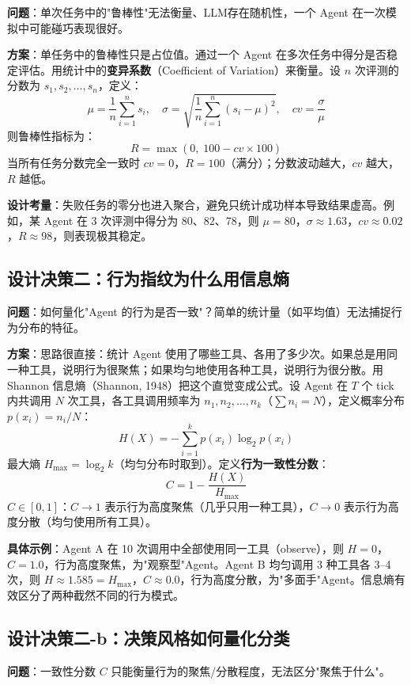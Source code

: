 \documentclass[12pt,a4paper]{article}%
\begin{document}
\textbf{问题}：单次任务中的"鲁棒性"无法衡量、LLM存在随机性，一个 Agent 在一次模拟中可能碰巧表现很好。

\textbf{方案}：单任务中的鲁棒性只是占位值。通过一个 Agent 在多次任务中得分是否稳定评估。用统计中的\textbf{变异系数}（Coefficient of Variation）来衡量。设 $n$ 次评测的分数为 $s_1, s_2, \ldots, s_n$，定义：
\[
\mu = \frac{1}{n}\sum_{i=1}^{n}s_i, \quad \sigma = \sqrt{\frac{1}{n}\sum_{i=1}^{n}(s_i - \mu)^2}, \quad cv = \frac{\sigma}{\mu}
\]
则鲁棒性指标为：
\[
R = \max(0,\; 100 - cv \times 100)
\]
当所有任务分数完全一致时 $cv = 0$，$R = 100$（满分）；分数波动越大，$cv$ 越大，$R$ 越低。

\textbf{设计考量}：失败任务的零分也进入聚合，避免只统计成功样本导致结果虚高。例如，某 Agent 在 3 次评测中得分为 80、82、78，则 $\mu = 80$，$\sigma \approx 1.63$，$cv \approx 0.02$，$R \approx 98$，则表现极其稳定。

\subsection{设计决策二：行为指纹为什么用信息熵}

\textbf{问题}：如何量化"Agent 的行为是否一致"？简单的统计量（如平均值）无法捕捉行为分布的特征。

\textbf{方案}：思路很直接：统计 Agent 使用了哪些工具、各用了多少次。如果总是用同一种工具，说明行为很聚焦；如果均匀地使用各种工具，说明行为很分散。用 Shannon 信息熵（Shannon, 1948）把这个直觉变成公式。设 Agent 在 $T$ 个 tick 内共调用 $N$ 次工具，各工具调用频率为 $n_1, n_2, \ldots, n_k$（$\sum n_i = N$），定义概率分布 $p(x_i) = n_i / N$：
\[
H(X) = -\sum_{i=1}^{k} p(x_i) \log_2 p(x_i)
\]
最大熵 $H_{\max} = \log_2 k$（均匀分布时取到）。定义\textbf{行为一致性分数}：
\[
C = 1 - \frac{H(X)}{H_{\max}}
\]
$C \in [0, 1]$：$C \to 1$ 表示行为高度聚焦（几乎只用一种工具），$C \to 0$ 表示行为高度分散（均匀使用所有工具）。

\textbf{具体示例}：Agent A 在 10 次调用中全部使用同一工具（observe），则 $H = 0$，$C = 1.0$，行为高度聚焦，为"观察型"Agent。Agent B 均匀调用 3 种工具各 3--4 次，则 $H \approx 1.585 = H_{\max}$，$C \approx 0.0$，行为高度分散，为"多面手"Agent。信息熵有效区分了两种截然不同的行为模式。

\subsection{设计决策二-b：决策风格如何量化分类}

\textbf{问题}：一致性分数 $C$ 只能衡量行为的聚焦/分散程度，无法区分"聚焦于什么"。
\end{document}
